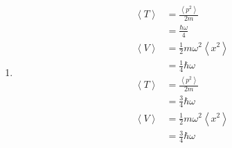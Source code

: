 \documentclass{article}
\newcommand{\ev}[1]{\left< #1 \right>}
\begin{document}
\begin{enumerate}
  \item

        \begin{align*}
          \ev{T} & = \frac{\ev{p^2}}{2 m}            \\
                 & = \frac{\hbar \omega}{4}          \\
          \ev{V} & = \frac{1}{2} m \omega^2 \ev{x^2} \\
                 & = \frac{1}{4} \hbar \omega        \\
          \ev{T} & = \frac{\ev{p^2}}{2 m}            \\
                 & = \frac{3}{4} \hbar \omega        \\
          \ev{V} & = \frac{1}{2} m \omega^2 \ev{x^2} \\
                 & = \frac{3}{4} \hbar \omega
        \end{align*}
\end{enumerate}

\subsection{}
\end{document}
